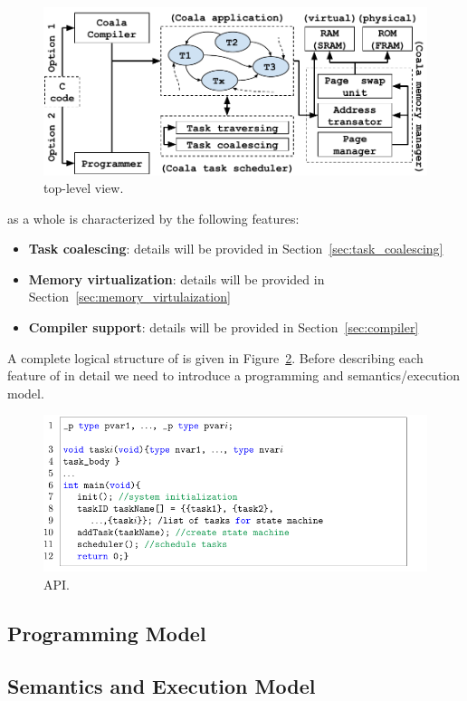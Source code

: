 \begin{figure}
	\centering
	\includegraphics[width=\columnwidth]{figures/viper_block_diagram}
	\caption{\sys top-level view.}
	\label{fig:system_overview}
\end{figure}

\sys as a whole is characterized by the following features:

\begin{itemize}
	\item \textbf{Task coalescing}: details will be provided in Section~\ref{sec:task_coalescing}
	\item \textbf{Memory virtualization}: details will be provided in Section~\ref{sec:memory_virtulaization}
	\item \textbf{Compiler support}: details will be provided in Section~\ref{sec:compiler}
\end{itemize}

A complete logical structure of \sys is given in Figure~\ref{fig:system_overview}. Before describing each feature of \sys in detail we need to introduce a programming and semantics/execution model.

\begin{figure}
	\centering
	\includegraphics[width=\columnwidth]{figures/taskification_example}
	\caption{\sys API.}
	\label{fig:system_overview}
\end{figure}


\subsection{Programming Model}
\label{sec:overview_programming_model}



\subsection{Semantics and Execution Model}
\label{sec:overview_semantics}

